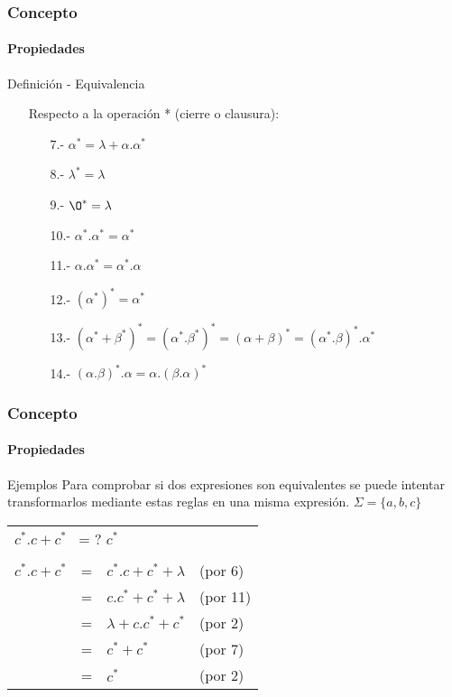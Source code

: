 \documentclass{beamer}
\begin{document}
        \begin{frame}
			\frametitle{Concepto}
			\framesubtitle{Propiedades}

			\begin{block}{Definici\'on - Equivalencia}
			    \begin{itemize}
			        \item[] Respecto a la operaci\'on * (cierre o clausura):
			        \begin{itemize}
			            \item[7.-] $\alpha^{*} = \lambda + \alpha.\alpha^{*}$
			            \item[8.-] $\lambda^{*} = \lambda$
			            \item[9.-] $\O^{*} = \lambda$
			            \item[10.-] $\alpha^{*}.\alpha^{*} = \alpha^{*}$
			            \item[11.-] $\alpha.\alpha^{*} = \alpha^{*}.\alpha$
			            \item[12.-] $(\alpha^{*})^{*} = \alpha^{*}$
			            \item[13.-] $(\alpha^{*}+\beta^{*})^{*} = (\alpha^{*}.\beta^{*})^{*} = (\alpha + \beta)^{*} = (\alpha^{*}.\beta)^{*}.\alpha^{*}$
			            \item[14.-] $(\alpha.\beta)^{*}.\alpha = \alpha.(\beta.\alpha)^{*}$
			        \end{itemize}
			    \end{itemize}
			\end{block}
		\end{frame}

        \begin{frame}
			\frametitle{Concepto}
			\framesubtitle{Propiedades}

			\begin{exampleblock}{Ejemplos}
			    Para comprobar si dos expresiones son equivalentes se puede intentar transformarlos mediante estas reglas en una misma expresi\'on. $\Sigma=\{a,b,c\}$ 
			    \begin{table}[H]
			                \begin{tabular}{rcll}
			                   \multicolumn{4}{l}{$c^{*}.c+c^{*}$ \textquestiondown~= ? $c^{*}$} \\ 
			                   & & & \\
			                    $c^{*}.c + c^{*}$
			                    & = & $c^{*}.c + c^{*} + \lambda$ & (por 6) \\
			                    & = & $c.c^{*} + c^{*} + \lambda$ & (por 11) \\
                               & = & $\lambda + c.c^{*} + c^{*}$ & (por 2) \\
                               & = & $c^{*} + c^{*}$ & (por 7) \\
                               & = & $c^{*}$ & (por 2) \\
			                \end{tabular}
			        \end{table}
			\end{exampleblock}
		\end{frame}
\end{document}
